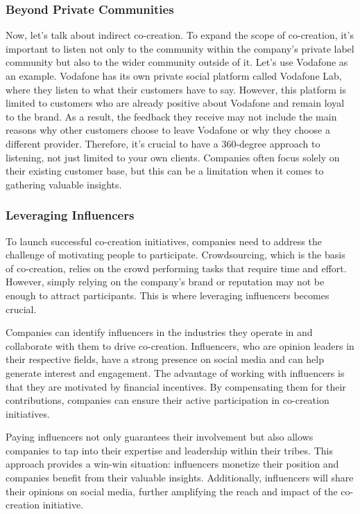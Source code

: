 \subsubsection{Beyond Private
    Communities}\label{beyond-private-communities}

Now, let's talk about indirect co-creation. To expand the scope of
co-creation, it's important to listen not only to the community within
the company's private label community but also to the wider community
outside of it. Let's use Vodafone as an example. Vodafone has its own
private social platform called Vodafone Lab, where they listen to what
their customers have to say. However, this platform is limited to
customers who are already positive about Vodafone and remain loyal to
the brand. As a result, the feedback they receive may not include the
main reasons why other customers choose to leave Vodafone or why they
choose a different provider. Therefore, it's crucial to have a
360-degree approach to listening, not just limited to your own clients.
Companies often focus solely on their existing customer base, but this
can be a limitation when it comes to gathering valuable insights.

\subsubsection{Leveraging Influencers}\label{leveraging-influencers}

To launch successful co-creation initiatives, companies need to address
the challenge of motivating people to participate. Crowdsourcing, which
is the basis of co-creation, relies on the crowd performing tasks that
require time and effort. However, simply relying on the company's brand
or reputation may not be enough to attract participants. This is where
leveraging influencers becomes crucial.

Companies can identify influencers in the industries they operate in and
collaborate with them to drive co-creation. Influencers, who are opinion
leaders in their respective fields, have a strong presence on social
media and can help generate interest and engagement. The advantage of
working with influencers is that they are motivated by financial
incentives. By compensating them for their contributions, companies can
ensure their active participation in co-creation initiatives.

Paying influencers not only guarantees their involvement but also allows
companies to tap into their expertise and leadership within their
tribes. This approach provides a win-win situation: influencers monetize
their position and companies benefit from their valuable insights.
Additionally, influencers will share their opinions on social media,
further amplifying the reach and impact of the co-creation initiative.

